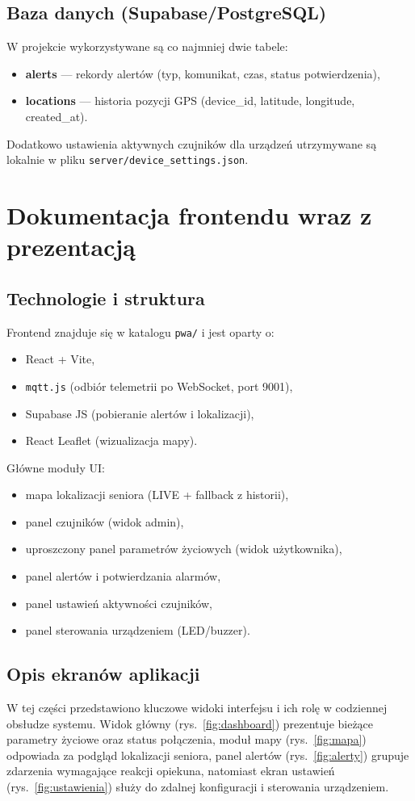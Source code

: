 \documentclass[a4paper,12pt]{article}
\begin{document}
\subsection{Baza danych (Supabase/PostgreSQL)}
W projekcie wykorzystywane są co najmniej dwie tabele:
\begin{itemize}
  \item \textbf{alerts} --- rekordy alertów (typ, komunikat, czas, status potwierdzenia),
  \item \textbf{locations} --- historia pozycji GPS (device\_id, latitude, longitude, created\_at).
\end{itemize}

Dodatkowo ustawienia aktywnych czujników dla urządzeń utrzymywane są lokalnie w pliku \texttt{server/device\_settings.json}.

\section{Dokumentacja frontendu wraz z prezentacją}
\subsection{Technologie i struktura}
Frontend znajduje się w katalogu \texttt{pwa/} i jest oparty o:
\begin{itemize}
  \item React + Vite,
  \item \texttt{mqtt.js} (odbiór telemetrii po WebSocket, port 9001),
  \item Supabase JS (pobieranie alertów i lokalizacji),
  \item React Leaflet (wizualizacja mapy).
\end{itemize}

Główne moduły UI:
\begin{itemize}
  \item mapa lokalizacji seniora (LIVE + fallback z historii),
  \item panel czujników (widok admin),
  \item uproszczony panel parametrów życiowych (widok użytkownika),
  \item panel alertów i potwierdzania alarmów,
  \item panel ustawień aktywności czujników,
  \item panel sterowania urządzeniem (LED/buzzer).
\end{itemize}

\subsection{Opis ekranów aplikacji}
W tej części przedstawiono kluczowe widoki interfejsu i ich rolę w codziennej obsłudze systemu.
Widok główny (rys.~\ref{fig:dashboard}) prezentuje bieżące parametry życiowe oraz status połączenia,
moduł mapy (rys.~\ref{fig:mapa}) odpowiada za podgląd lokalizacji seniora,
panel alertów (rys.~\ref{fig:alerty}) grupuje zdarzenia wymagające reakcji opiekuna,
natomiast ekran ustawień (rys.~\ref{fig:ustawienia}) służy do zdalnej konfiguracji i sterowania urządzeniem.
\end{document}
